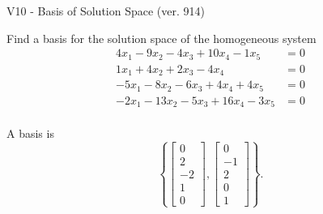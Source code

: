 \begin{exercise}
  \begin{exerciseTitle}V10 - Basis of Solution Space (ver. 914)\end{exerciseTitle}
  \begin{exerciseStatement}
    Find a basis for the solution space of the homogeneous system 
\begin{align*}
 4 x_ 1 -9 x_ 2 -4 x_ 3 + 10 x_ 4 -1 x_ 5 &= 0  \\ 
  1 x_ 1 + 4 x_ 2 + 2 x_ 3 -4 x_ 4 &= 0  \\ 
  -5 x_ 1 -8 x_ 2 -6 x_ 3 + 4 x_ 4 + 4 x_ 5 &= 0  \\ 
  -2 x_ 1 -13 x_ 2 -5 x_ 3 + 16 x_ 4 -3 x_ 5 &= 0  \\ 
 \end{align*}


 
  \end{exerciseStatement}

  \begin{exerciseAnswer}
   A basis is   
\[\left\{\left[\begin{array}{c}
0 \\
2 \\
-2 \\
1 \\
0
\end{array}\right] , \left[\begin{array}{c}
0 \\
-1 \\
2 \\
0 \\
1
\end{array}\right]\right\}.\]

  


  \end{exerciseAnswer}
\end{exercise}